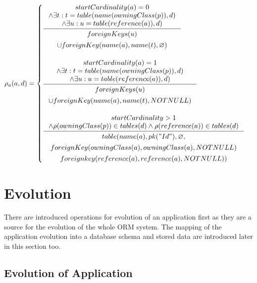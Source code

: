 \documentclass[11pt]{article}
\begin{document}
$
\rho_a(a,d) = \begin{cases}
 \inference{ startCardinality(a) = 0 \\ \wedge \exists t : t = table(name(owningClass(p)), d) \\ \wedge \exists u : u = table(reference(a)), d)}{ 
 \begin{gathered}
 foreignKeys(u) \\ \cup foreignKey(name(a), name(t),  \varnothing) 
 \end{gathered}
 }
  \\ \\
 \inference{ startCardinality(a) = 1 \\ \wedge \exists t : t = table(name(owningClass(p)), d) \\ \wedge \exists u : u = table(reference(a)), d)}{\begin{gathered}  
foreignKeys(u) \\ \cup  foreignKey(name(a), name(t),  NOTNULL) \\
\end{gathered}
} \\ \\
 
  \inference{  startCardinality > 1 \\ \wedge \rho(owningClass(p)) \in tables(d) \wedge \rho(reference(a)) \in tables(d)}{
  \begin{gathered}  
 table(name(a), pk("Id"), \varnothing, \\ foreignKey(owningClass(a),owningClass(a), NOTNULL) \\ foreignkey(reference(a), reference(a), NOTNULL)) 
  \end{gathered}}  
 \end{cases}
$

\section{Evolution}
\label{sec:eorm}
There are introduced operations for evolution of an application first as they are a source for the evolution of the whole ORM system. The mapping of the application evolution into a database schema and stored data are introduced later in this section too.

\subsection{Evolution of Application}
\label{sec:appEvolution}
\end{document}
